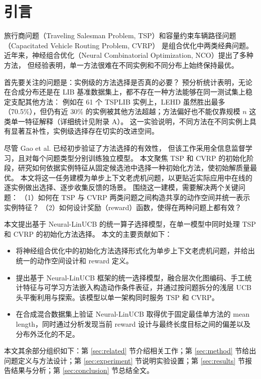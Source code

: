
\section{引言}

旅行商问题（Traveling Salesman Problem, TSP）和容量约束车辆路径问题（Capacitated Vehicle Routing Problem, CVRP）
是组合优化中两类经典问题。近年来，神经组合优化（Neural Combinatorial Optimization, NCO）提出了多种方法\cite{bello2016nco,kool2019attention}，
但经验表明，单一方法很难在不同实例和不同分布上始终保持最优。

首先要关注的问题是：实例级的方法选择是否真的必要？
预分析统计表明，无论在合成分布还是在 LIB 基准数据集上，都不存在一种方法能够在同一测试集上稳定支配其他方法：
例如在 61 个 TSPLIB 实例上，LEHD 虽然胜出最多（70.5\%），但仍有近 30\% 的实例被其他方法超越；方法偏好也不能仅靠规模 $n$ 这类单一特征解释（详细统计见附录 A）。
这一实验说明，不同方法在不同实例上具有显著互补性，实例级选择存在切实的改进空间。

尽管 Gao et al.\cite{gao2025nss} 已经初步验证了方法选择的有效性，
但该工作采用全信息监督学习，且对每个问题类型分别训练独立模型。
本文聚焦 TSP 和 CVRP 的初始化阶段，研究如何依据实例特征从固定候选池中选择一种初始化方法，使初始解质量最优。
本文将这一任务建模为单步上下文老虎机问题，以更贴近实际应用中在线的逐实例做出选择、逐步收集反馈的场景。
围绕这一建模，需要解决两个关键问题：
（1）如何在 TSP 与 CVRP 两类问题之间构造共享的动作空间并统一表示实例特征？
（2）如何设计奖励（reward）函数，使得在两种问题上都有效？

本文提出基于 Neural-LinUCB 的统一算子选择模型，在单一模型中同时处理 TSP 和 CVRP 的初始化方法选择。
本文的主要贡献如下：
\begin{itemize}
  \item 将神经组合优化中的初始化方法选择形式化为单步上下文老虎机问题，并给出统一的动作空间设计和 reward 定义。
  \item 提出基于 Neural-LinUCB 框架的统一选择模型，融合层次化图编码、手工统计特征与可学习方法嵌入构造动作条件表征，并通过按问题拆分的浅层 UCB 头平衡利用与探索。该模型以单一架构同时服务 TSP 和 CVRP。
  \item 在合成混合数据集上验证 Neural-LinUCB 取得优于固定最佳单方法的 mean length，同时通过分析发现当前 reward 设计与最终长度目标之间的偏差以及分布外泛化的不足。
\end{itemize}

本文其余部分组织如下：第 \ref{sec:related} 节介绍相关工作；第 \ref{sec:method} 节给出问题定义与方法设计；第 \ref{sec:experiment} 节说明实验设置；第 \ref{sec:results} 节报告结果与分析；第 \ref{sec:conclusion} 节总结全文。
